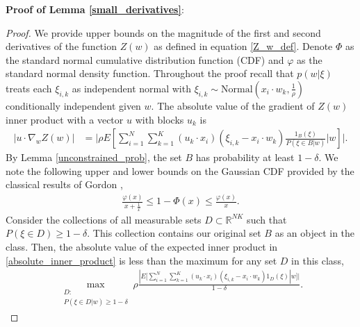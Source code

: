 \documentclass{article}
\numberwithin{equation}{section}
\theoremstyle{Lemma}
\theoremstyle{Corollary}
\theoremstyle{Theorem}
\theoremstyle{Remark}
\begin{document}
\textbf{Proof of Lemma \ref{small_derivatives}}:
\begin{proof}
    We provide upper bounds on the magnitude of the first and second derivatives of the function $Z(w)$ as defined in equation \eqref{Z_w_def}. Denote $\Phi$ as the standard normal cumulative distribution function (CDF) and $\varphi$ as the standard normal density function. Throughout the proof recall that $p(w|\xi)$ treats each $\xi_{i,k}$ as independent normal with $\xi_{i,k} \sim \text{Normal}(x_{i}\cdot w_{k},\frac{1}{\rho})$ conditionally independent given $w$. The absolute value of the gradient of $Z(w)$ inner product with a vector $u$ with blocks $u_{k}$ is
    \begin{align}
       \big|u\cdot \nabla_{w}Z(w)\big|&= \Big|\rho E[\sum_{i=1}^{N}\sum_{k=1}^{K}(u_{k}\cdot x_{i})(\xi_{i,k} - x_{i}\cdot w_{k})\frac{1_{B}(\xi)}{P(\xi \in B|w)}|w]\Big|.\label{absolute_inner_product}
    \end{align}
    By Lemma \ref{unconstrained_prob}, the set $B$ has probability at least $1-\delta$. We note the following upper and lower bounds on the Gaussian CDF provided by the classical results of Gordon \cite{gordon1941values},
    \begin{align}
    \frac{\varphi(x)}{x+\frac{1}{x}}\leq 1-\Phi(x) \leq \frac{\varphi(x)}{x}.
    \end{align}
Consider the collections of all measurable sets $D \subset \mathbb{R}^{NK}$ such that $P(\xi \in D) \geq 1-\delta$. This collection contains our original set $B$ as an object in the class. Then, the absolute value of the expected inner product in \eqref{absolute_inner_product} is less than the maximum for any set $D$ in this class,
    \begin{align}
    \max_{\substack{D:\\ P(\xi \in D|w) \geq 1-\delta}} \rho\frac{|E[\sum_{i=1}^{N}\sum_{k=1}^{K}(u_{k}\cdot x_{i})(\xi_{i,k} - x_{i}\cdot w_{k})1_{D}(\xi)|w]|}{1-\delta}.\label{score_term_to_max}

\end{align}
\end{proof}
\end{document}
